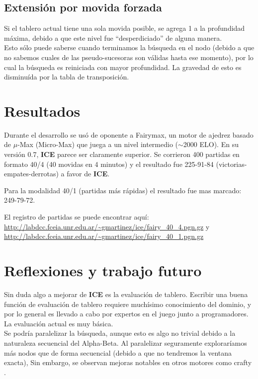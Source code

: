 \documentclass{article}
\newcommand{\ICE}[0]{{\bf ICE}}
\begin{document}
\begin{multicols}{2}
\subsection{Extensión por movida forzada}
Si el tablero actual tiene una sola movida posible, se agrega 1 a la
profundidad máxima, debido a que este nivel fue ``desperdiciado'' de
alguna manera.
\\

Esto sólo puede saberse cuando terminamos la búsqueda en el nodo
(debido a que no sabemos cuales de las pseudo-sucesoras son válidas
hasta ese momento), por lo cual la búsqueda es reiniciada con mayor
profundidad. La gravedad de esto es disminuída por la tabla de
transposición.

\section{Resultados}
Durante el desarrollo se usó de oponente a Fairymax\cite{fairymax},
un motor de ajedrez basado de $\mu$-Max (Micro-Max) que juega a un
nivel intermedio ($\sim$2000 ELO\cite{wiki:elo}). En su versión 0.7,
\ICE{} parece ser claramente superior. Se corrieron 400 partidas en
formato 40/4 (40 movidas en 4 minutos) y el resultado fue 225-91-84
(victorias-empates-derrotas) a favor de \ICE{}.

Para la modalidad 40/1 (partidas más rápidas) el resultado fue mas
marcado: 249-79-72.

El registro de partidas se puede encontrar aquí:
\url{http://labdcc.fceia.unr.edu.ar/~gmartinez/ice/fairy\_40\_4.pgn.gz}
y
\url{http://labdcc.fceia.unr.edu.ar/~gmartinez/ice/fairy\_40\_1.pgn.gz}

\section{Reflexiones y trabajo futuro}
Sin duda algo a mejorar de \ICE{} es la evaluación de tablero. Escribir
una buena función de evaluación de tablero requiere muchísimo
conocimiento del dominio, y por lo general es llevado a cabo por
expertos en el juego junto a programadores. La evaluación actual es muy
básica.
\\

Se podría paralelizar la búsqueda\cite{parallel-ab}, aunque esto
es algo no trivial debido a la naturaleza secuencial del Alpha-Beta.
Al paralelizar seguramente exploraríamos más nodos que de forma
secuencial (debido a que no tendremos la ventana exacta), Sin embargo,
se observan mejoras notables en otros motores como crafty \cite{crafty}
\cite{crafty-threads}.
\\


\end{multicols}
\end{document}
